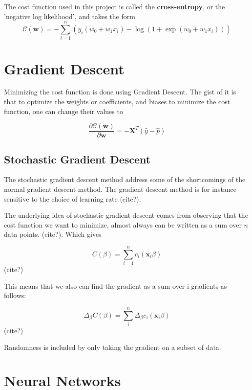 The cost function used in this project is called the \textbf{cross-entropy}, or the
'negative log likelihood', and takes the form
\begin{equation}\label{eq:cross-entropy}
	\mathcal{C}(\boldsymbol{w})=-\sum_{i=1}^n  \left(y_i(w_0+w_1x_i) -\log{(1+\exp{(w_0+w_1x_i)})}\right)
\end{equation}

\section{Gradient Descent}\label{seq:gradient}
Minimizing the cost function is done using Gradient Descent.
The gist of it is that to optimize the weights or coefficients,
and biases to minimize the cost function, one can change their values to

\begin{equation}\label{eq:delta-c}
	\frac{\partial \mathcal{C}(\boldsymbol{w})}{\partial \boldsymbol{w}} = -\boldsymbol{X}^T\left(\hat{y}-\hat{p}\right)
\end{equation}

\subsection{Stochastic Gradient Descent}
The stochastic gradient descent method address some of the shortcomings
of the normal gradient descent method. The gradient descent method is
for instance sensitive to the choice of learning rate (cite?).

The underlying idea of stochastic gradient descent comes from observing
that the cost function we want to minimize, almost always can be written as
a sum over \(n\) data points. (cite?). Which gives

\begin{equation}
	C(\beta) = \sum\limits_{i=1}^n c_i (\mathbf{x}_i\beta)
\end{equation} (cite?)

This means that we also can find the gradient as a sum over i gradients
as follows:

\begin{equation}
	\Delta_{\beta} C(\beta) = \sum\limits_{i}^n \Delta_{\beta}c_i (\mathbf{x}_i\beta)
\end{equation} (cite?)

Randomness is included by only taking the gradient on a subset of data.

\section{Neural Networks}
